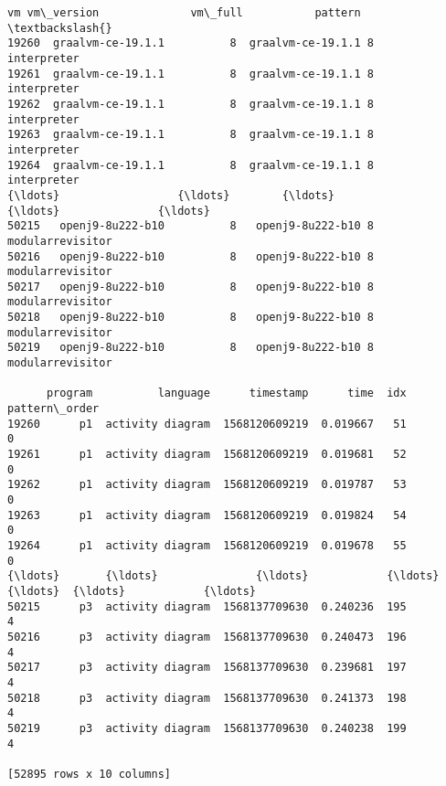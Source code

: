 \documentclass[11pt]{article}
\newcommand{\prompt}[4]{
        \llap{{\color{#2}[#3]: #4}}\vspace{-1.25em}
    }
\begin{document}
            \begin{tcolorbox}[breakable, boxrule=.5pt, size=fbox, pad at break*=1mm, opacityfill=0]
\prompt{Out}{outcolor}{4}{\hspace{3.5pt}}
\begin{Verbatim}[commandchars=\\\{\}]
                      vm vm\_version              vm\_full           pattern  \textbackslash{}
19260  graalvm-ce-19.1.1          8  graalvm-ce-19.1.1 8       interpreter
19261  graalvm-ce-19.1.1          8  graalvm-ce-19.1.1 8       interpreter
19262  graalvm-ce-19.1.1          8  graalvm-ce-19.1.1 8       interpreter
19263  graalvm-ce-19.1.1          8  graalvm-ce-19.1.1 8       interpreter
19264  graalvm-ce-19.1.1          8  graalvm-ce-19.1.1 8       interpreter
{\ldots}                  {\ldots}        {\ldots}                  {\ldots}               {\ldots}
50215   openj9-8u222-b10          8   openj9-8u222-b10 8  modularrevisitor
50216   openj9-8u222-b10          8   openj9-8u222-b10 8  modularrevisitor
50217   openj9-8u222-b10          8   openj9-8u222-b10 8  modularrevisitor
50218   openj9-8u222-b10          8   openj9-8u222-b10 8  modularrevisitor
50219   openj9-8u222-b10          8   openj9-8u222-b10 8  modularrevisitor

      program          language      timestamp      time  idx  pattern\_order
19260      p1  activity diagram  1568120609219  0.019667   51              0
19261      p1  activity diagram  1568120609219  0.019681   52              0
19262      p1  activity diagram  1568120609219  0.019787   53              0
19263      p1  activity diagram  1568120609219  0.019824   54              0
19264      p1  activity diagram  1568120609219  0.019678   55              0
{\ldots}       {\ldots}               {\ldots}            {\ldots}       {\ldots}  {\ldots}            {\ldots}
50215      p3  activity diagram  1568137709630  0.240236  195              4
50216      p3  activity diagram  1568137709630  0.240473  196              4
50217      p3  activity diagram  1568137709630  0.239681  197              4
50218      p3  activity diagram  1568137709630  0.241373  198              4
50219      p3  activity diagram  1568137709630  0.240238  199              4

[52895 rows x 10 columns]
\end{Verbatim}
\end{tcolorbox}
        
\end{document}

